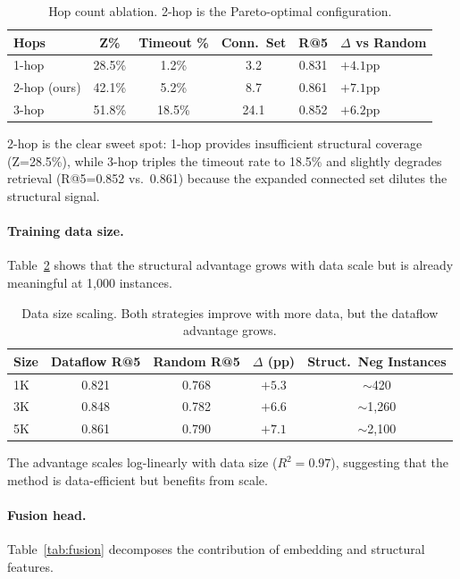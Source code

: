 \documentclass[11pt]{article}
\begin{document}
\begin{table}[h]
\centering
\caption{Hop count ablation. 2-hop is the Pareto-optimal configuration.}
\label{tab:hop}
\small
\begin{tabular}{lccccl}
\toprule
\textbf{Hops} & \textbf{Z\%} & \textbf{Timeout \%} & \textbf{Conn.\ Set} & \textbf{R@5} & \textbf{$\Delta$ vs Random} \\
\midrule
1-hop          & 28.5\% & 1.2\%  & 3.2  & 0.831 & $+4.1$pp \\
2-hop (ours)   & 42.1\% & 5.2\%  & 8.7  & 0.861 & $+7.1$pp \\
3-hop          & 51.8\% & 18.5\% & 24.1 & 0.852 & $+6.2$pp \\
\bottomrule
\end{tabular}
\end{table}

2-hop is the clear sweet spot: 1-hop provides insufficient structural coverage (Z{=}28.5\%), while 3-hop triples the timeout rate to 18.5\% and slightly degrades retrieval (R@5{=}0.852 vs.\ 0.861) because the expanded connected set dilutes the structural signal.

\paragraph{Training data size.}
Table~\ref{tab:scale} shows that the structural advantage grows with data scale but is already meaningful at 1{,}000 instances.

\begin{table}[h]
\centering
\caption{Data size scaling. Both strategies improve with more data, but the dataflow advantage grows.}
\label{tab:scale}
\small
\begin{tabular}{lcccc}
\toprule
\textbf{Size} & \textbf{Dataflow R@5} & \textbf{Random R@5} & \textbf{$\Delta$ (pp)} & \textbf{Struct.\ Neg Instances} \\
\midrule
1K   & 0.821 & 0.768 & $+5.3$ & $\sim$420 \\
3K   & 0.848 & 0.782 & $+6.6$ & $\sim$1{,}260 \\
5K   & 0.861 & 0.790 & $+7.1$ & $\sim$2{,}100 \\
\bottomrule
\end{tabular}
\end{table}

The advantage scales log-linearly with data size ($R^2{=}0.97$), suggesting that the method is data-efficient but benefits from scale.

\paragraph{Fusion head.}
Table~\ref{tab:fusion} decomposes the contribution of embedding and structural features.
\end{document}

